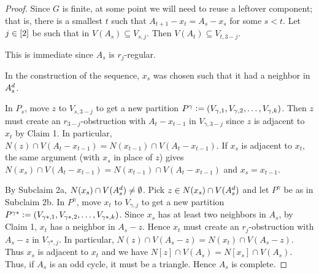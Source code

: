 \begin{proof}
			Since $G$ is finite, at some point we will need to reuse a leftover component; that is, 
			there is a smallest $t$ such that $A_{t + 1} - x_t = A_s - x_s$ for some $s <
			t$.  Let $j \in \left[2\right]$ be such that in $V(A_s) \subseteq V_{s, j}$. 
			Then $V(A_t) \subseteq V_{t, 3-j}$.  


			This is immediate since $A_s$ is $r_j$-regular.


			
			In the construction of the sequence, $x_s$ was chosen such that it had a neighbor in $A_s^{d}$.


			In $P_s$, move $z$ to $V_{s, 3-j}$ to get a new partition $P^\gamma \mathrel{\mathop:}= \left( V_{\gamma,
			1}, V_{\gamma, 2}, \ldots, V_{\gamma, k} \right)$. Then $z$ must create an
			$r_{3-j}$-obstruction with $A_t - x_{t-1}$ in $V_{\gamma, 3-j}$ since
			$z$ is adjacent to $x_t$ by Claim 1.  
			In particular, $N(z) \cap V(A_t - x_{t-1}) = N(x_{t-1}) \cap V(A_t -
			x_{t-1})$.  If $x_s$ is adjacent to $x_t$, the same argument (with $x_s$ in place of $z$) gives $N(x_s) \cap V(A_t - x_{t-1}) = N(x_{t-1}) \cap V(A_t - x_{t-1})$ and $x_s = x_{t-1}$.


			By Subclaim 2a, $N(x_s) \cap V(A_s^{d}) \neq \emptyset$. Pick $z \in N(x_s) \cap V(A_s^{d})$ and let $P^\gamma$ be as in Subclaim 2b. In $P^\gamma$, move    $x_t$ to $V_{\gamma, j}$ to get a new partition $P^{\gamma*} \mathrel{\mathop:}= \left( V_{\gamma*, 1},
			V_{\gamma*, 2}, \ldots, V_{\gamma*, k} \right)$. Since $x_s$ has at least two neighbors in $A_s$, by Claim 1, $x_t$ has a neighbor in $A_s - z$.  Hence $x_t$ must create an
			$r_{j}$-obstruction with $A_s - z$ in $V_{\gamma*, j}$.  In
			particular, $N(z) \cap V(A_s - z) = N(x_t) \cap V(A_s - z)$.  Thus $x_s$
			is adjacent to $x_t$ and we have $N[z] \cap V(A_s) = N[x_s] \cap
			V(A_s)$.  Thus, if $A_s$ is an odd cycle, it must be a triangle.  
			Hence $A_s$ is complete.  


\end{proof}
